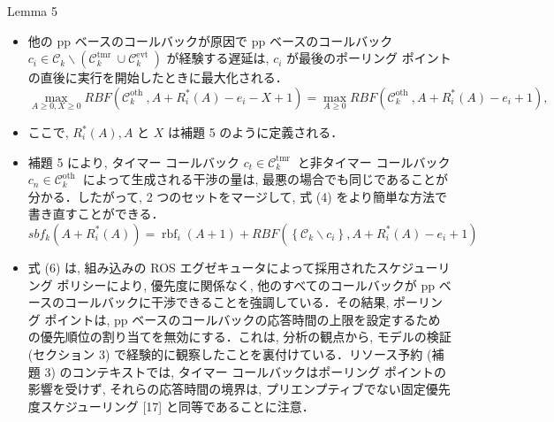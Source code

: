 \begin{frame}[label=lemma5]{Lemma 5}
    \begin{lemma}[]
        \begin{itemize}
            \item 他の pp ベースのコールバックが原因で pp ベースのコールバック $c_{i} \in \mathcal{C}_{k} \backslash\left(\mathcal{C}_{k}^{\text {tmr }} \cup \mathcal{C}_{k}^{\text {evt }}\right)$ が経験する遅延は, $c_{i}$ が最後のポーリング ポイントの直後に実行を開始したときに最大化される．
                  \begin{equation*}
                      \max _{A \geq 0, X \geq 0} R B F\left(\mathcal{C}_{k}^{\text {oth }}, A+R_{i}^{*}(A)-e_{i}-X+1\right)=\max _{A \geq 0} R B F\left(\mathcal{C}_{k}^{\text {oth }}, A+R_{i}^{*}(A)-e_{i}+1\right),
                  \end{equation*}

            \item ここで, $R_{i}^{*}(A), A$ と $X$ は補題 5 のように定義される．
        \end{itemize}
    \end{lemma}
\end{frame}

\begin{frame}{}
    \begin{itemize}
        \item 補題 5 により, タイマー コールバック $c_{t} \in \mathcal{C}_{k}^{\text {tmr }}$ と非タイマー コールバック $c_{n} \in \mathcal{C}_{k}^{\text {oth }}$ によって生成される干渉の量は, 最悪の場合でも同じであることが分かる．したがって, 2 つのセットをマージして, 式 (4) をより簡単な方法で書き直すことができる．
              \begin{equation*}
                  s b f_{k}\left(A+R_{i}^{*}(A)\right)=\operatorname{rbf}_{i}(A+1)+R B F\left(\left\{\mathcal{C}_{k} \backslash c_{i}\right\}, A+R_{i}^{*}(A)-e_{i}+1\right)
              \end{equation*}
    \end{itemize}
\end{frame}

\begin{frame}{}
    \begin{itemize}
        \item 式 (6) は, 組み込みの ROS エグゼキュータによって採用されたスケジューリング ポリシーにより, 優先度に関係なく, 他のすべてのコールバックが pp ベースのコールバックに干渉できることを強調している．その結果, ポーリング ポイントは, pp ベースのコールバックの応答時間の上限を設定するための優先順位の割り当てを無効にする．これは, 分析の観点から, モデルの検証 (セクション 3) で経験的に観察したことを裏付けている．リソース予約 (補題 3) のコンテキストでは, タイマー コールバックはポーリング ポイントの影響を受けず, それらの応答時間の境界は, プリエンプティブでない固定優先度スケジューリング [17] と同等であることに注意．
    \end{itemize}
\end{frame}


